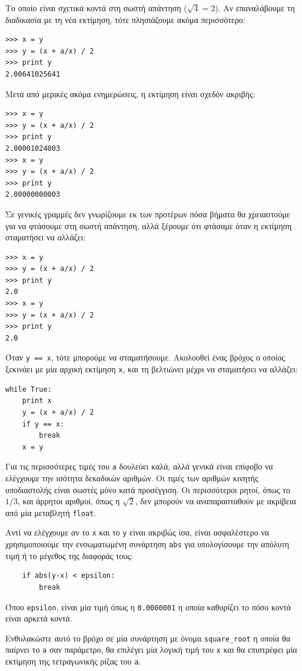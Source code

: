 \documentclass[10pt]{book}
\begin{document}
Το οποίο είναι σχετικά κοντά στη σωστή απάντηση ($\sqrt{4} = 2$). Αν
επαναλάβουμε τη διαδικασία με τη νέα εκτίμηση, τότε πλησιάζουμε ακόμα περισσότερο:

\begin{verbatim}
>>> x = y
>>> y = (x + a/x) / 2
>>> print y
2.00641025641
\end{verbatim}
%

Μετά από μερικές ακόμα ενημερώσεις, η εκτίμηση είναι σχεδόν ακριβής:

\begin{verbatim}
>>> x = y
>>> y = (x + a/x) / 2
>>> print y
2.00001024003
>>> x = y
>>> y = (x + a/x) / 2
>>> print y
2.00000000003
\end{verbatim}
%

Σε γενικές γραμμές δεν γνωρίζουμε εκ των προτέρων πόσα βήματα θα χρειαστούμε
για να φτάσουμε στη σωστή απάντηση, αλλά ξέρουμε ότι φτάσαμε όταν η εκτίμηση
σταματήσει να αλλάζει:

\begin{verbatim}
>>> x = y
>>> y = (x + a/x) / 2
>>> print y
2.0
>>> x = y
>>> y = (x + a/x) / 2
>>> print y
2.0
\end{verbatim}
%

Όταν {\tt y == x}, τότε μπορούμε να σταματήσουμε. Ακολουθεί ένας βρόχος ο
οποίος ξεκινάει με μία αρχική εκτίμηση {\tt x}, και τη βελτιώνει μέχρι
να σταματήσει να αλλάζει:

\begin{verbatim}
while True:
    print x
    y = (x + a/x) / 2
    if y == x:
        break
    x = y
\end{verbatim}
%

Για τις περισσότερες τιμές του {\tt a} δουλεύει καλά, αλλά γενικά
είναι επίφοβο να ελέγχουμε την ισότητα δεκαδικών αριθμών. Οι τιμές των αριθμών
κινητής υποδιαστολής είναι σωστές μόνο κατά προσέγγιση. Οι περισσότεροι ρητοί,
όπως το $1/3$, και άρρητοι αριθμοί, όπως η $\sqrt{2}$, δεν μπορούν
να αναπαρασταθούν με ακρίβεια από μία μεταβλητή {\tt float}.

Αντί να ελέγχουμε αν το {\tt x} και το {\tt y} είναι ακριβώς ίσα,
είναι ασφαλέστερο να χρησιμοποιούμε την ενσωματωμένη συνάρτηση  {\tt abs}  για
υπολογίσουμε την απόλυτη τιμή ή το μέγεθος της διαφοράς τους:

\begin{verbatim}
    if abs(y-x) < epsilon:
        break
\end{verbatim}
%

Όπου \verb"epsilon", είναι μία τιμή όπως η {\tt 0.0000001} 
η οποία καθορίζει το πόσο κοντά είναι αρκετά κοντά.
\\
\begin{exercise}

Ενθυλακώστε αυτό το βρόχο σε μία συνάρτηση με όνομα \verb"square_root" 
η οποία θα παίρνει το {\tt a} σαν παράμετρο, θα επιλέγει μία λογική
τιμή του {\tt x} και θα επιστρέφει μία εκτίμηση της τετραγωνικής ρίζας του
{\tt a}.
\end{exercise}
\end{document}
